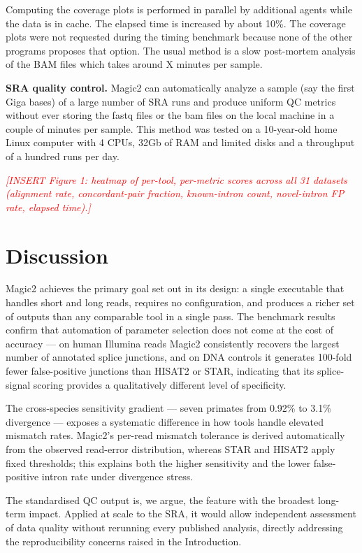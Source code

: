 \documentclass[11pt]{article}
\newcommand{\edcomment}[1]{\textcolor{red}{\textit{[#1]}}}
\begin{document}
Computing the coverage plots is performed in parallel by additional agents
while the data is in cache. The elapsed time is increased by about 10\%.
The coverage plots were not requested during the timing benchmark
because none of the other programs
proposes that option. The usual method is a slow post-mortem analysis of the BAM files
which takes around X minutes per sample.


\medskip\noindent\textbf{SRA quality control.}\quad
Magic2 can automatically analyze a sample (say the first Giga bases)
of a large number of SRA runs  and produce uniform QC metrics without
ever storing the fastq files or the bam files on the local machine
in a couple of minutes per sample. This method was tested on a 10-year-old home
Linux computer with 4 CPUs, 32Gb of RAM and limited disks and a throughput
of a hundred runs per day.

\edcomment{INSERT Figure 1: heatmap of per-tool, per-metric scores across
all 31 datasets (alignment rate, concordant-pair fraction,
known-intron count, novel-intron FP rate, elapsed time).}

\section*{Discussion}

Magic2 achieves the primary goal set out in its design: a single
executable that handles short and long reads, requires no
configuration, and produces a richer set of outputs than any
comparable tool in a single pass.
The benchmark results confirm that automation of parameter selection
does not come at the cost of accuracy — on human Illumina reads Magic2
consistently recovers the largest number of annotated splice junctions,
and on DNA controls it generates 100-fold fewer false-positive
junctions than HISAT2 or STAR, indicating that its splice-signal
scoring provides a qualitatively different level of specificity.

The cross-species sensitivity gradient — seven primates from 0.92\%
to 3.1\% divergence — exposes a systematic difference in how tools
handle elevated mismatch rates.
Magic2's per-read mismatch tolerance is derived automatically from the
observed read-error distribution, whereas STAR and HISAT2 apply fixed
thresholds; this explains both the higher sensitivity and the lower
false-positive intron rate under divergence stress.

The standardised QC output is, we argue, the feature with the broadest
long-term impact.
Applied at scale to the SRA, it would allow independent assessment of
data quality without rerunning every published analysis, directly
addressing the reproducibility concerns raised in the Introduction.
\end{document}
